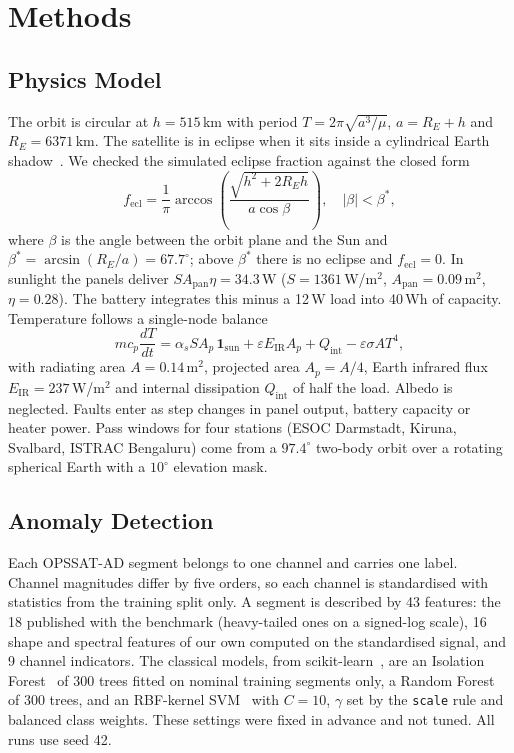 \documentclass[conference]{IEEEtran}
\begin{document}
\section{Methods}
\subsection{Physics Model}
The orbit is circular at $h = 515$\,km with period $T = 2\pi\sqrt{a^3/\mu}$, $a = R_E + h$ and
$R_E = 6371$\,km. The satellite is in eclipse when it sits inside a cylindrical Earth
shadow~\cite{vallado2013}. We checked the simulated eclipse fraction against the closed form
\begin{equation}
f_{\mathrm{ecl}} = \frac{1}{\pi}\arccos\!\left(\frac{\sqrt{h^{2}+2R_E h}}{a\cos\beta}\right),
\quad |\beta| < \beta^{*},
\label{eq:ecl}
\end{equation}
where $\beta$ is the angle between the orbit plane and the Sun and
$\beta^{*} = \arcsin(R_E/a) = 67.7^{\circ}$; above $\beta^{*}$ there is no eclipse and
$f_{\mathrm{ecl}} = 0$. In sunlight the panels deliver $S A_{\mathrm{pan}} \eta = 34.3$\,W
($S = 1361$\,W/m$^2$, $A_{\mathrm{pan}} = 0.09$\,m$^2$, $\eta = 0.28$). The battery integrates
this minus a 12\,W load into 40\,Wh of capacity. Temperature follows a single-node
balance~\cite{gilmore2002}
\begin{equation}
m c_p \frac{dT}{dt} = \alpha_s S A_p\,\mathbf{1}_{\mathrm{sun}} + \varepsilon E_{\mathrm{IR}} A_p
+ Q_{\mathrm{int}} - \varepsilon \sigma A T^{4},
\label{eq:thermal}
\end{equation}
with radiating area $A = 0.14$\,m$^2$, projected area $A_p = A/4$, Earth infrared flux
$E_{\mathrm{IR}} = 237$\,W/m$^2$ and internal dissipation $Q_{\mathrm{int}}$ of half the load.
Albedo is neglected. Faults enter as step changes in panel output, battery capacity or heater
power. Pass windows for four stations (ESOC Darmstadt, Kiruna, Svalbard, ISTRAC Bengaluru)
come from a $97.4^{\circ}$ two-body orbit over a rotating spherical Earth with a $10^{\circ}$
elevation mask.

\subsection{Anomaly Detection}
Each OPSSAT-AD segment belongs to one channel and carries one label. Channel magnitudes differ
by five orders, so each channel is standardised with statistics from the training split only.
A segment is described by 43 features: the 18 published with the benchmark (heavy-tailed ones
on a signed-log scale), 16 shape and spectral features of our own computed on the standardised
signal, and 9 channel indicators. The classical models, from
scikit-learn~\cite{pedregosa2011}, are an Isolation Forest~\cite{liu2008} of 300 trees fitted
on nominal training segments only, a Random Forest~\cite{breiman2001} of 300 trees, and an
RBF-kernel SVM~\cite{cortes1995} with $C = 10$, $\gamma$ set by the \texttt{scale} rule and
balanced class weights. These settings were fixed in advance and not tuned. All runs use
seed 42.
\end{document}
